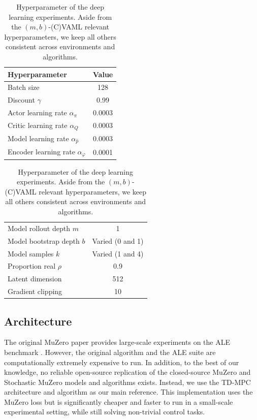 \begin{table}[]
    \centering
    \begin{tabular}{l|c}
    Hyperparameter & Value \\\hline
    Batch size & 128\\
    Discount $\gamma$ & 0.99 \\
    Actor learning rate $\alpha_\pi$  & 0.0003 \\
    Critic learning rate $\alpha_Q$ & 0.0003 \\
    Model learning rate $\alpha_{\hat{p}}$  & 0.0003 \\
    Encoder learning rate $\alpha_\varphi$ & 0.0001 \\
    \end{tabular}
    \begin{tabular}{l|c}
     \\
    Model rollout depth $m$ & 1 \\
    Model bootstrap depth $b$ & Varied (0 and 1) \\
    Model samples $k$ & Varied (1 and 4) \\
    Proportion real $\rho$ & 0.9 \\
    Latent dimension & 512 \\
    Gradient clipping & 10 \\
    \end{tabular}
    \caption{Hyperparameter of the deep learning experiments. Aside from the $(m,b)$-(C)VAML relevant hyperparameters, we keep all others consistent across environments and algorithms.}
    \label{tab:cvaml:hyperparams}
\end{table}

\subsection{Architecture}
The original MuZero paper \parencite{schrittwieser2020mastering} provides large-scale experiments on the ALE benchmark \parencite{bellemare13arcade}.
However, the original algorithm and the ALE suite are computationally extremely expensive to run.
In addition, to the best of our knowledge, no reliable open-source replication of the closed-source MuZero and Stochastic MuZero models and algorithms exists.
Instead, we use the TD-MPC architecture and algorithm \parencite{hansen2022temporal} as our main reference.
This implementation uses the MuZero loss but is significantly cheaper and faster to run in a small-scale experimental setting, while still solving non-trivial control tasks.

